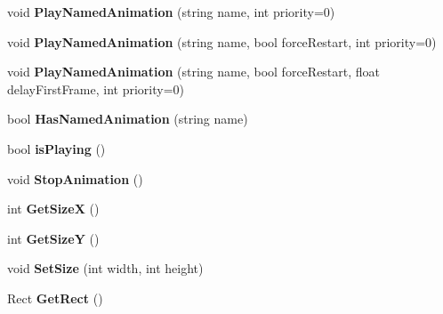 \begin{DoxyCompactItemize}
\item 
\hypertarget{interface_i_rage_pixel_a238311c1825d86210ed9f479f144c19c}{void {\bfseries Play\-Named\-Animation} (string name, int priority=0)}\label{interface_i_rage_pixel_a238311c1825d86210ed9f479f144c19c}

\item 
\hypertarget{interface_i_rage_pixel_a7b51f0c20206c632592733bb20c25989}{void {\bfseries Play\-Named\-Animation} (string name, bool force\-Restart, int priority=0)}\label{interface_i_rage_pixel_a7b51f0c20206c632592733bb20c25989}

\item 
\hypertarget{interface_i_rage_pixel_ad70e7b7b47ca30e5d292480ed722ab15}{void {\bfseries Play\-Named\-Animation} (string name, bool force\-Restart, float delay\-First\-Frame, int priority=0)}\label{interface_i_rage_pixel_ad70e7b7b47ca30e5d292480ed722ab15}

\item 
\hypertarget{interface_i_rage_pixel_a0d6fc45f3299498cfd21301904bea7e0}{bool {\bfseries Has\-Named\-Animation} (string name)}\label{interface_i_rage_pixel_a0d6fc45f3299498cfd21301904bea7e0}

\item 
\hypertarget{interface_i_rage_pixel_a48ca7f62bcce0f0d25dfce3da97c7155}{bool {\bfseries is\-Playing} ()}\label{interface_i_rage_pixel_a48ca7f62bcce0f0d25dfce3da97c7155}

\item 
\hypertarget{interface_i_rage_pixel_aa0e42c7b01a5c996d88e3b439d57362a}{void {\bfseries Stop\-Animation} ()}\label{interface_i_rage_pixel_aa0e42c7b01a5c996d88e3b439d57362a}

\item 
\hypertarget{interface_i_rage_pixel_a272cfec9fa3b80588c59e7381e37b2f6}{int {\bfseries Get\-Size\-X} ()}\label{interface_i_rage_pixel_a272cfec9fa3b80588c59e7381e37b2f6}

\item 
\hypertarget{interface_i_rage_pixel_a57f635a748ceea4222b0891a0b82d139}{int {\bfseries Get\-Size\-Y} ()}\label{interface_i_rage_pixel_a57f635a748ceea4222b0891a0b82d139}

\item 
\hypertarget{interface_i_rage_pixel_a9fb4204bcc05381c43ab2a4ea0eefbc0}{void {\bfseries Set\-Size} (int width, int height)}\label{interface_i_rage_pixel_a9fb4204bcc05381c43ab2a4ea0eefbc0}

\item 
\hypertarget{interface_i_rage_pixel_a66d97dacd871c546af228bd569194a5b}{Rect {\bfseries Get\-Rect} ()}\label{interface_i_rage_pixel_a66d97dacd871c546af228bd569194a5b}


\end{DoxyCompactItemize}

